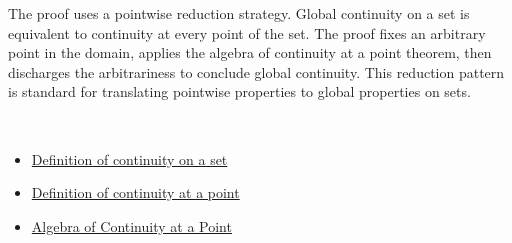 \begin{remark*}
The proof uses a pointwise reduction strategy. Global continuity on a set is equivalent to continuity at every point of the set. The proof fixes an arbitrary point in the domain, applies the algebra of continuity at a point theorem, then discharges the arbitrariness to conclude global continuity. This reduction pattern is standard for translating pointwise properties to global properties on sets.
\end{remark*}

\begin{remark*}[Dependencies]~\\
\begin{itemize}
  \item \hyperref[def:continuous-on-a-set]{Definition of continuity on a set}
  \item \hyperref[def:continuous-at-a-point]{Definition of continuity at a point}
  \item \hyperref[thm:algebra-of-continuity-at-a-point]{Algebra of Continuity at a Point}
\end{itemize}
\end{remark*}
